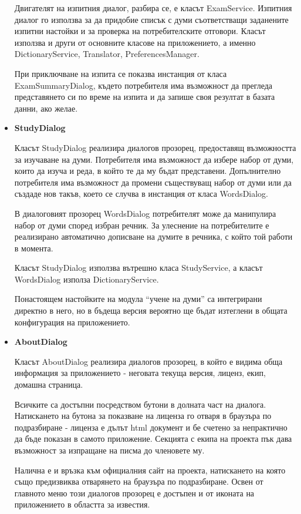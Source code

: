 \begin{itemize}
      Двигателят на изпитния диалог, разбира се, е класът
      ExamService. Изпитния диалог го използва за да придобие списък с
      думи съответстващи заданените изпитни настойки и за проверка на
      потребителските отговори. Класът използва и други от основните
      класове на приложението, а именно DictionaryService, Translator,
      PreferencesManager. 

      При приключване на изпита се показва инстанция от класа
      ExamSummaryDialog, където потребителя има възможност да прегледа
      представянето си по време на изпита и да запише своя резултат в
      базата данни, ако желае.
    \item \textbf{StudyDialog}

      Класът StudyDialog реализира диалогов прозорец, предоставящ
      възможността за изучаване на думи. Потребителя има възможност да
      избере набор от думи, които да изуча и реда, в който те да му
      бъдат представени. Допълнително потребителя има възможност да
      промени съществуващ набор от думи или да създаде нов такъв,
      което се случва в инстанция от класа WordsDialog. 

      В диалоговият прозорец WordsDialog потребителят може да
      манипулира набор от думи според избран речник. За улеснение на
      потребителите е реализирано автоматично дописване на думите в
      речника, с който той работи в момента.

      Класът StudyDialog използва вътрешно класа StudyService, а
      класът WordsDialog използа DictionaryService.

      Понастоящем настойките на модула "`учене на думи"' са
      интегрирани директно в него, но в бъдеща версия вероятно ще
      бъдат изтеглени в общата конфигурация на приложението.
    \item \textbf{AboutDialog}

      Класът AboutDialog реализира диалогов прозорец, в който е видима
      обща информация за приложението - неговата текуща версия,
      лиценз, екип, домашна страница.

      Всичките са достъпни посредством бутони в долната част на
      диалога. Натискането на бутона за показване на лиценза го отваря
      в браузъра по подразбиране - лиценза е дълът html документ и бе
      счетено за непрактично да бъде показан в самото
      приложение. Секцията с екипа на проекта пък дава възможност за
      изпращане на писма до членовете му.

      Налична е и връзка към официалния сайт на проекта, натискането
      на която също предизвиква отварянето на браузъра по
      подразбиране. Освен от главното меню този диалогов прозорец е
      достъпен и от иконата на приложението в областта за известия.


\end{itemize}
